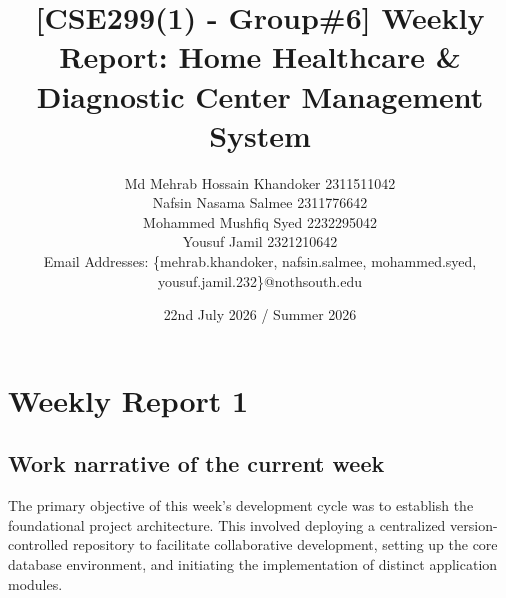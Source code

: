 \documentclass[onecolumn,journal]{IEEEtran}
\begin{document}
	
	\title{[CSE299(1) - Group\#6] Weekly Report: Home Healthcare \& Diagnostic Center Management System}
	\date{22nd July 2026 / Summer 2026}
	\author{Md Mehrab Hossain Khandoker 2311511042\\
		Nafsin Nasama Salmee 2311776642\\
		Mohammed Mushfiq Syed 2232295042\\
		Yousuf Jamil 2321210642\\
		Email Addresses: \{mehrab.khandoker, nafsin.salmee, mohammed.syed, yousuf.jamil.232\}@nothsouth.edu}
	\maketitle
	
	\section{Weekly Report 1}
	
	\subsection{Work narrative of the current week}
	
	The primary objective of this week's development cycle was to establish the foundational project architecture. This involved deploying a centralized version-controlled repository to facilitate collaborative development, setting up the core database environment, and initiating the implementation of distinct application modules.
	
\end{document}
